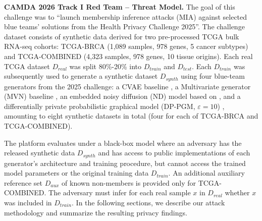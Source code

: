 \documentclass[11pt]{article}
\begin{document}
\vspace{0.5em}
\noindent
\textbf{CAMDA 2026 Track I Red Team -- Threat Model.}
The goal of this challenge was to ``launch membership inference attacks (MIA) against selected blue teams’ solutions from the Health Privacy Challenge 2025''. The challenge dataset consists of synthetic data derived for two pre-processed TCGA bulk RNA-seq cohorts: TCGA-BRCA (1{,}089 samples, 978 genes, 5 cancer subtypes) and TCGA-COMBINED (4{,}323 samples, 978 genes, 10 tissue origins). Each real TCGA dataset $D_{real}$ was split 80\%-20\% into $D_{train}$ and $D_{test}$. Each $D_{train}$ was subsequently used to generate 
a synthetic dataset $D_{synth}$ using four blue-team generators from the 2025 challenge: a CVAE baseline \cite{sohn2015learning}, a Multivariate generator (MVN) baseline \cite{ozturk2026towards}, an embedded noisy diffusion (ND) model based on \cite{dockhorndifferentially}
, and a differentially private probabilistic graphical model (DP-PGM, $\varepsilon=10$) \cite{chen2024biologicallyplausibleprivategene, mckenna2019graphical}, amounting to eight  synthetic datasets in total (four for each of TCGA-BRCA and TCGA-COMBINED). 

The platform evaluates under a black-box model where an adversary has the released synthetic data $D_{synth}$ and has access to public implementations of each generator's architecture and training procedure, but cannot access the trained model parameters or the original training data $D_{train}$. An additional auxiliary reference set $D_{aux}$ of known non-members is provided only for TCGA-COMBINED. 
The adversary must infer for each real sample $x$ in $D_{real}$ whether $x$ was included in $D_{train}$.
In the following sections, we describe our attack methodology and summarize the resulting privacy findings. %





\end{document}

